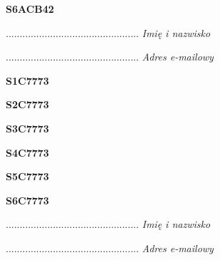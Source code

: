\begin{turn}{90}\huge \textbf{S6ACB42}\end{turn}

\begin{turn}{90}\begin{minipage}{\linewidth} \vspace{20mm} ................................................  \textit{Imię i nazwisko}\end{minipage}\end{turn}

\begin{turn}{90}\begin{minipage}{\linewidth} \vspace{20mm} ................................................  \textit{Adres e-mailowy}\end{minipage}\end{turn}

\begin{turn}{90}\huge \textbf{S1C7773}\end{turn}

\begin{turn}{90}\huge \textbf{S2C7773}\end{turn}

\begin{turn}{90}\huge \textbf{S3C7773}\end{turn}

\begin{turn}{90}\huge \textbf{S4C7773}\end{turn}

\begin{turn}{90}\huge \textbf{S5C7773}\end{turn}

\begin{turn}{90}\huge \textbf{S6C7773}\end{turn}

\begin{turn}{90}\begin{minipage}{\linewidth} \vspace{20mm} ................................................  \textit{Imię i nazwisko}\end{minipage}\end{turn}

\begin{turn}{90}\begin{minipage}{\linewidth} \vspace{20mm} ................................................  \textit{Adres e-mailowy}\end{minipage}\end{turn}

